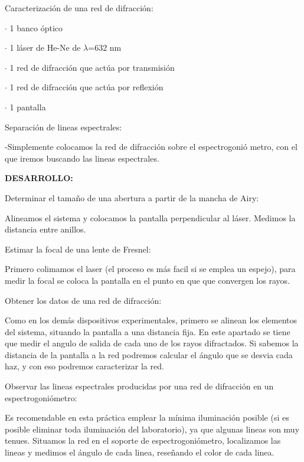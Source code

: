 \documentclass[12pt,thmsa]{article}
\begin{document}
Caracterizaci\'{o}n de una red de difracci\'{o}n:

$\cdot$ 1 banco \'{o}ptico

$\cdot$ 1 l\'{a}ser de He-Ne de $\lambda $=632 nm

$\cdot$ 1 red de difracci\'{o}n que act\'{u}a por transmisi\'{o}n

$\cdot$ 1 red de difracci\'{o}n que act\'{u}a por reflexi\'{o}n

$\cdot$ 1 pantalla


Separaci\'{o}n de lineas espectrales:

-Simplemente colocamos la red de difracci\'{o}n sobre el espectrogoni\'{o}%
metro, con el que iremos buscando las lineas espectrales.

\textbf{DESARROLLO:}

\vspace{1pt}Determinar el tama\~{n}o de una abertura a partir de la mancha
de Airy:

Alineamos el sistema y colocamos la pantalla perpendicular al l\'{a}ser.
Medimos la distancia entre anillos.

Estimar la focal de una lente de Fresnel:

Primero colimamos el laser (el proceso es m\'{a}s facil si se emplea un
espejo), para medir la focal se coloca la pantalla en el punto en que que
convergen los rayos.

Obtener los datos de una red de difracci\'{o}n:

Como en los dem\'{a}s dispositivos experimentales, primero se alinean los
elementos del sistema, situando la pantalla a una distancia fija. En este
apartado se tiene que medir el angulo de salida de cada uno de los rayos
difractados. Si sabemos la distancia de la pantalla a la red podremos
calcular el \'{a}ngulo que se desvia cada haz, y con eso podremos
caracterizar la red.

Observar las lineas espectrales producidas por una red de difracci\'{o}n en
un espectrogoni\'{o}metro:

Es recomendable en esta pr\'{a}ctica emplear la m\'{i}nima iluminaci\'{o}n
posible (si es posible eliminar toda iluminaci\'{o}n del laboratorio), ya
que algunas lineas son muy tenues. Situamos la red en el soporte de
espectrogoni\'{o}metro, localizamos las lineas y medimos el \'{a}ngulo de
cada linea, rese\~{n}ando el color de cada linea.
\end{document}
